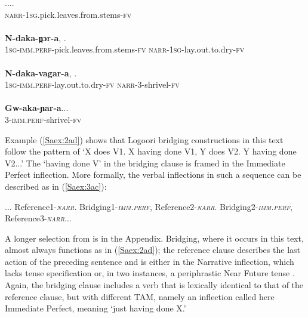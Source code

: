 \documentclass[output=paper]{LSP/langsci}
\begin{document}
\begin{exe}
\ex \label{Saex:2ad}
\begin{xlist}
\ex \label{Saex:2a}
\gll ...\underline{}.\\
\textsc{narr}-\textsc{1sg.}pick.leaves.from.stems\textsc{-fv}\\
\glt {}\\
\ex \label{Saex:2b}
\gll \textbf{N-daka-n̪ɔr-a},          \underline{}.\\
1\textsc{sg}-\textsc{imm.perf-}pick.leaves.from.stems-\textsc{fv}  \textsc{narr}-\textsc{1sg}-lay.out.to.dry-\textsc{fv}\\
\glt {}\\
\ex \label{Saex:2c}
\gll \textbf{N-daka-vagar-a},      \underline{}.\\
\textsc{1sg-imm.perf-}lay.out.to.dry-\textsc{fv}  \textsc{narr}-3-shrivel-\textsc{fv}\\
\glt {}\\
\ex \label{Saex:2d}
\gll \textbf{Gw-aka-ɲar-a}...\\     	       
    3-\textsc{imm.perf-}shrivel-\textsc{fv}\\
\glt {} 
\end{xlist}
\end{exe}


Example (\ref{Saex:2ad}) shows that Logoori bridging constructions in this text follow the pattern of `X does V1. X having done V1, Y does V2. Y having done V2...' The `having done V' in the bridging clause is framed in the Immediate Perfect inflection. More formally, the verbal inflections in such a sequence can be described as in (\ref{Saex:3ac}): 

\begin{exe}
\ex \label{Saex:3ac}
\begin{xlist}
\ex \label{Saex:3a}
\glt ... Reference1-\textit{\textsc{narr}}.
\ex \label{Saex:3b}
\glt Bridging1-\textit{\textsc{imm.perf}}, Reference2-\textit{\textsc{narr}}.
\ex \label{Saex:3c}
\glt Bridging2-\textit{\textsc{imm.perf}}, Reference3-\textit{\textsc{narr}}...
\end{xlist}
\end{exe}


A longer selection from \citet{Chesi2014} is in the Appendix. Bridging, where it occurs in this text, almost always functions as in (\ref{Saex:2ad}); the reference clause describes the last action of the preceding sentence and is either in the Narrative inflection, which lacks tense specification or, in two instances, a periphrastic Near Future tense \citep[see][]{Sarvasy2016}. Again, the bridging clause includes a verb that is lexically identical to that of the reference clause, but with different TAM, namely an inflection called here Immediate Perfect, meaning `just having done X.'
\end{document}
